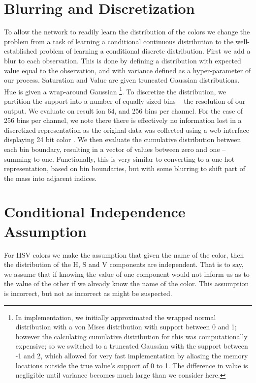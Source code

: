 \documentclass[11pt,letterpaper]{article}
\newcommand{\parencite}{\cite}
\begin{document}
\section{Blurring and Discretization}
To allow the network to readily learn the distribution of the colors we change the problem from a task of learning a conditional continuous distribution to the well-established problem of learning a conditional discrete distribution.
First we add a blur to each observation.
This is done by defining a distribution with expected value equal to the observation,
and with variance defined as a hyper-parameter of our process.
Saturation and Value are given truncated Gaussian distributions.
Hue is given a wrap-around Gaussian \footnote{In implementation, we initially approximated the wrapped normal distribution with a von Mises distribution with support between 0 and 1; however the calculating cumulative distribution for this was computationally expensive; so we switched to a truncated Gaussian with the support between -1 and 2, which allowed for very fast implementation by aliasing the memory locations outside the true value's support of 0 to 1. The difference in value is negligible until variance becomes much large than we consider here.}.
To discretize the distribution, we partition the support into a number of equally sized bins -- the resolution of our output.
We evaluate on result ion 64, and 256 bins per channel.
For the case of 256 bins per channel, we note there there is effectively no information lost in a discretized representation as the original data was collected using a web interface displaying 24 bit color \parencite{Monroe2010XKCDdataset}.
We then evaluate the cumulative distribution between each bin boundary, resulting in a vector of values between zero and one -- summing to one.
Functionally, this is very similar to converting to a one-hot representation, based on bin boundaries, but with some blurring to shift part of the mass into adjacent indices.




\section{Conditional Independence Assumption}
For HSV colors we make the assumption that given the name of the color, then the distribution of the H, S and V components are independent.
That is to say, we assume that if knowing the value of one component would not inform us as to the value of the other if we already know the name of the color.
This assumption is incorrect, but not as incorrect as might be suspected.
\end{document}
